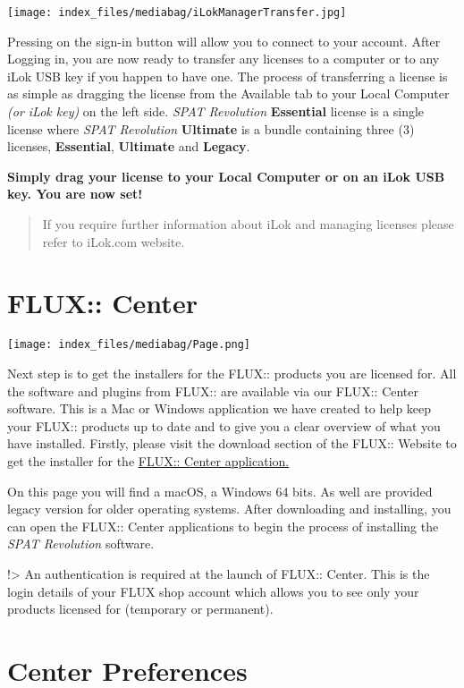 \documentclass[
  letterpaper,
  DIV=11,
  numbers=noendperiod]{scrreport}
\begin{document}
\texttt{[image: index\_files/mediabag/iLokManagerTransfer.jpg]}

Pressing on the sign-in button will allow you to connect to your
account. After Logging in, you are now ready to transfer any licenses to
a computer or to any iLok USB key if you happen to have one. The process
of transferring a license is as simple as dragging the license from the
Available tab to your Local Computer \emph{(or iLok key)} on the left
side. \emph{SPAT Revolution} \textbf{Essential} license is a single
license where \emph{SPAT Revolution} \textbf{Ultimate} is a bundle
containing three (3) licenses, \textbf{Essential}, \textbf{Ultimate} and
\textbf{Legacy}.

\textbf{Simply drag your license to your Local Computer or on an iLok
USB key. You are now set!}

\begin{quote}
If you require further information about iLok and managing licenses
please refer to iLok.com website.
\end{quote}

\hypertarget{flux-center}{%
\section{FLUX:: Center}\label{flux-center}}

\texttt{[image: index\_files/mediabag/Page.png]}

Next step is to get the installers for the FLUX:: products you are
licensed for. All the software and plugins from FLUX:: are available via
our FLUX:: Center software. This is a Mac or Windows application we have
created to help keep your FLUX:: products up to date and to give you a
clear overview of what you have installed. Firstly, please visit the
download section of the FLUX:: Website to get the installer for the
\href{https://flux.audio/download/}{FLUX:: Center application.}

On this page you will find a macOS, a Windows 64 bits. As well are
provided legacy version for older operating systems. After downloading
and installing, you can open the FLUX:: Center applications to begin the
process of installing the \emph{SPAT Revolution} software.

!\textgreater{} An authentication is required at the launch of FLUX::
Center. This is the login details of your FLUX shop account which allows
you to see only your products licensed for (temporary or permanent).

\hypertarget{center-preferences}{%
\section{Center Preferences}\label{center-preferences}}
\end{document}
